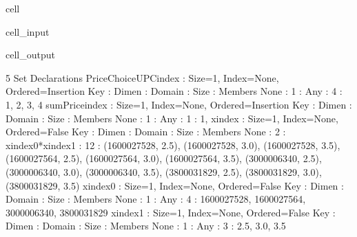 \documentclass[letterpaper,10pt,english]{jupyterBook}
\begin{document}
\begin{sphinxuseclass}{cell}\begin{sphinxVerbatimInput}

\begin{sphinxuseclass}{cell_input}
\begin{sphinxVerbatim}[commandchars=\\\{\}]
\end{sphinxVerbatim}

\end{sphinxuseclass}\end{sphinxVerbatimInput}
\begin{sphinxVerbatimOutput}

\begin{sphinxuseclass}{cell_output}
\begin{sphinxVerbatim}[commandchars=\\\{\}]
5 Set Declarations
    PriceChoiceUPC\PYGZus{}index : Size=1, Index=None, Ordered=Insertion
        Key  : Dimen : Domain : Size : Members
        None :     1 :    Any :    4 : \PYGZob{}1, 2, 3, 4\PYGZcb{}
    sumPrice\PYGZus{}index : Size=1, Index=None, Ordered=Insertion
        Key  : Dimen : Domain : Size : Members
        None :     1 :    Any :    1 :    \PYGZob{}1,\PYGZcb{}
    x\PYGZus{}index : Size=1, Index=None, Ordered=False
        Key  : Dimen : Domain              : Size : Members
        None :     2 : x\PYGZus{}index\PYGZus{}0*x\PYGZus{}index\PYGZus{}1 :   12 : \PYGZob{}(1600027528, 2.5), (1600027528, 3.0), (1600027528, 3.5), (1600027564, 2.5), (1600027564, 3.0), (1600027564, 3.5), (3000006340, 2.5), (3000006340, 3.0), (3000006340, 3.5), (3800031829, 2.5), (3800031829, 3.0), (3800031829, 3.5)\PYGZcb{}
    x\PYGZus{}index\PYGZus{}0 : Size=1, Index=None, Ordered=False
        Key  : Dimen : Domain : Size : Members
        None :     1 :    Any :    4 : \PYGZob{}1600027528, 1600027564, 3000006340, 3800031829\PYGZcb{}
    x\PYGZus{}index\PYGZus{}1 : Size=1, Index=None, Ordered=False
        Key  : Dimen : Domain : Size : Members
        None :     1 :    Any :    3 : \PYGZob{}2.5, 3.0, 3.5\PYGZcb{}


\end{sphinxVerbatim}
\end{sphinxuseclass}
\end{sphinxVerbatimOutput}
\end{sphinxuseclass}
\end{document}
